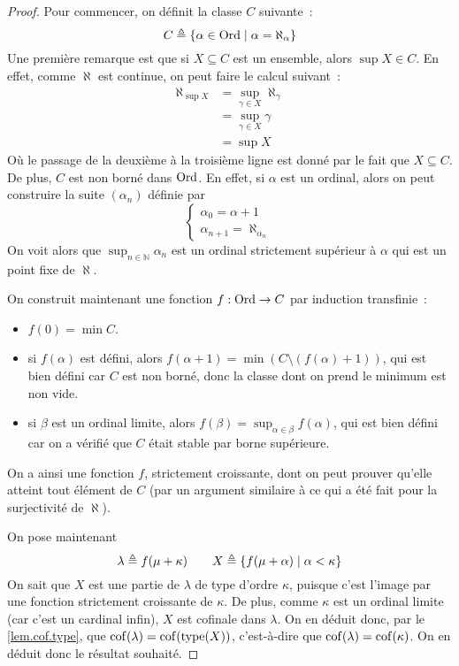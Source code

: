 \begin{proof}
  Pour commencer, on définit la classe $C$ suivante~:
  \[C \triangleq \{\alpha \in \operatorname{Ord}\mid \alpha = \aleph_\alpha\}\]
  Une première remarque est que si $X\subseteq C$ est un ensemble, alors
  $\sup X \in C$. En effet, comme $\aleph$ est continue, on peut faire le calcul
  suivant~:
  \begin{align*}
    \aleph_{\sup X} &= \sup_{\gamma \in X} \aleph_\gamma\\
    &= \sup_{\gamma \in X} \gamma\\
    &= \sup X
  \end{align*}
  Où le passage de la deuxième à la troisième ligne est donné par le fait que
  $X\subseteq C$. De plus, $C$ est non borné dans $\operatorname{Ord}$. En effet, si $\alpha$
  est un ordinal, alors on peut construire la suite $(\alpha_n)$ définie par
  \[\left\{\begin{array}{c}
  \alpha_0 = \alpha + 1\\
  \alpha_{n+1} = \aleph_{\alpha_n}
  \end{array}\right.\]
  On voit alors que $\sup_{n \in \mathbb N} \alpha_n$ est un ordinal strictement
  supérieur à $\alpha$ qui est un point fixe de $\aleph$.

  On construit maintenant une fonction $f : \operatorname{Ord} \to C$ par induction
  transfinie~:
  \begin{itemize}
  \item $f(0) = \min C$.
  \item si $f(\alpha)$ est défini, alors
    $f(\alpha + 1) = \min(C \setminus (f(\alpha) + 1))$, qui est bien défini car
    $C$ est non borné, donc la classe dont on prend le minimum est non vide.
  \item si $\beta$ est un ordinal limite, alors
    $f(\beta) = \sup_{\alpha \in \beta} f(\alpha)$, qui est bien défini car
    on a vérifié que $C$ était stable par borne supérieure.
  \end{itemize}
  On a ainsi une fonction $f$, strictement croissante, dont on peut prouver
  qu'elle atteint tout élément de $C$ (par un argument similaire à ce qui a été
  fait pour la surjectivité de $\aleph$).

  On pose maintenant
  \[\lambda \triangleq f(\mu + \kappa)\qquad
  X \triangleq \{f(\mu + \alpha)\mid \alpha < \kappa\}\]
  On sait que $X$ est une partie de $\lambda$ de type d'ordre $\kappa$, puisque
  c'est l'image par une fonction strictement croissante de $\kappa$. De plus,
  comme $\kappa$ est un ordinal limite (car c'est un cardinal infin), $X$ est
  cofinale dans $\lambda$. On en déduit donc, par le \cref{lem.cof.type}, que
  $\operatorname{cof}(\lambda) = \operatorname{cof}(\operatorname{type}(X))$, c'est-à-dire que
  $\operatorname{cof}(\lambda) = \operatorname{cof}(\kappa)$. On en déduit donc le résultat souhaité.
\end{proof}

